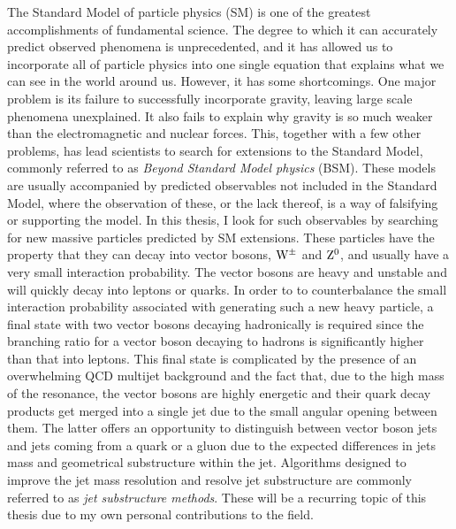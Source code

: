 \noindent The Standard Model of particle physics (SM) is one of the greatest accomplishments of fundamental science. The degree to which it can accurately predict observed phenomena is unprecedented, and it has allowed us to incorporate all of particle physics into one single equation that explains what we can see in the world around us. However, it has some shortcomings. One major problem is its failure to successfully incorporate gravity, leaving large scale phenomena unexplained. It also fails to explain why gravity is so much weaker than the electromagnetic and nuclear forces. This, together with a few other problems, has lead scientists to search for extensions to the Standard Model, commonly referred to as \emph{Beyond Standard Model physics} (BSM). These models are usually accompanied by predicted observables not included in the Standard Model, where the observation of these, or the lack thereof, is a way of falsifying or supporting the model.
\newline
\newline
In this thesis, I look for such observables by searching for new massive particles predicted by SM extensions. These particles have the property that they can decay into vector bosons, $\mathrm{W}^{\pm}$ and $\mathrm{Z}^{0}$, and usually have a very small interaction probability. The vector bosons are heavy and unstable and will quickly decay into leptons or quarks. In order to to counterbalance the small interaction probability associated with generating such a new heavy particle, a final state with two vector bosons decaying hadronically is required since the branching ratio for a vector boson decaying to hadrons is significantly higher than that into leptons. This final state is complicated by the presence of an overwhelming QCD multijet background and the fact that, due to the high mass of the resonance, the vector bosons are highly energetic and their quark decay products get merged into a single jet due to the small angular opening between them. The latter offers an opportunity to distinguish between vector boson jets and jets coming from a quark or a gluon due to the expected differences in jets mass and geometrical substructure within the jet. Algorithms designed to improve the jet mass resolution and resolve jet substructure are commonly referred to as \emph{jet substructure methods}. These will be a recurring topic of this thesis due to my own personal contributions to the field.
\newline
\newline
